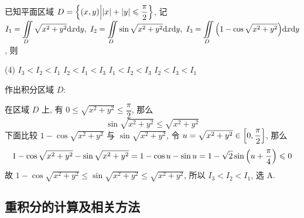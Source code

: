\begin{example}[2019 数二]
    已知平面区域 $D=\qty{(x,y)\Big| |x|+|y|\leqslant\dfrac{\pi}{2}}$, 记 $\displaystyle I_1=\iint\limits_D\sqrt{x^2+y^2}\dd x\dd y,~I_2=\iint\limits_D\sin\sqrt{x^2+y^2}\dd x\dd y,~I_3=\iint\limits_D\qty(1-\cos\sqrt{x^2+y^2})\dd x\dd y$, 则
    \begin{tasks}(4)
        \task $I_3<I_2<I_1$
        \task $I_2<I_1<I_3$
        \task $I_1<I_2<I_3$
        \task $I_2<I_3<I_1$
    \end{tasks}
\end{example}
\begin{solution}
    作出积分区域 $D$:\\
    \begin{minipage}{0.29\linewidth}
        \begin{figure}[H]
            \centering
            \caption{}
            \label{tikz_ercjfshuer}
        \end{figure}
    \end{minipage}\hfill
    \begin{minipage}{0.7\linewidth}
        在区域 $D$ 上, 有 $0\leqslant \sqrt{x^2+y^2}\leqslant \dfrac{\pi}{2}$, 那么 $$\sin\sqrt{x^2+y^2}\leqslant \sqrt{x^2+y^2}$$
        下面比较 $1-\cos\sqrt{x^2+y^2}$ 与 $\sin\sqrt{x^2+y^2}$, 令 $u=\sqrt{x^2+y^2}\in\qty[0,\dfrac{\pi}{2}]$, 那么
        $$1-\cos\sqrt{x^2+y^2}-\sin\sqrt{x^2+y^2}=1-\cos u-\sin u=1-\sqrt{2}\sin\qty(u+\dfrac{\pi}{4})\leqslant 0$$
        故 $1-\cos\sqrt{x^2+y^2}\leqslant \sin\sqrt{x^2+y^2}\leqslant \sqrt{x^2+y^2}$, 所以 $I_3<I_2<I_1$, 选 A.
    \end{minipage}
\end{solution}
\subsection{重积分的计算及相关方法}

